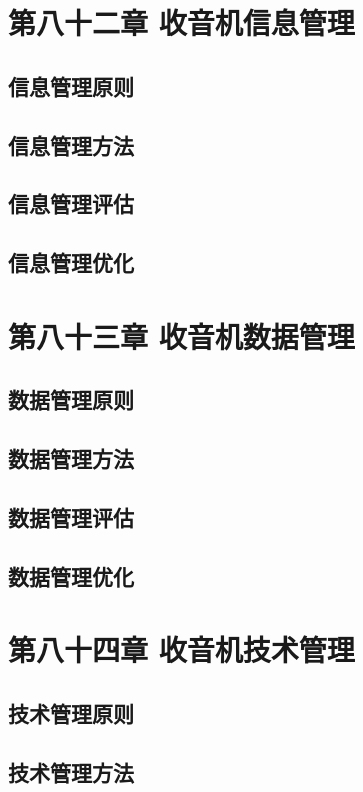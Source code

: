 \documentclass[12pt,UTF8]{ctexbook}
\begin{document}
\chapter{第八十二章 收音机信息管理}

\section{信息管理原则}
\section{信息管理方法}
\section{信息管理评估}
\section{信息管理优化}

\chapter{第八十三章 收音机数据管理}

\section{数据管理原则}
\section{数据管理方法}
\section{数据管理评估}
\section{数据管理优化}

\chapter{第八十四章 收音机技术管理}

\section{技术管理原则}
\section{技术管理方法}
\end{document}
